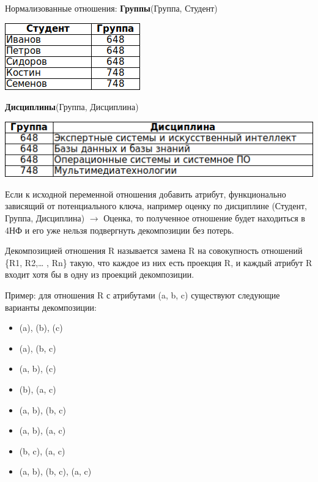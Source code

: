 \documentclass{beamer}
\begin{document}
\begin{frame}
Нормализованные отношения:
\textbf{Группы}(Группа, Студент)
\begin{center}
\includegraphics[scale=2]{images/ex-rasp-12.png}
\end{center}
\textbf{Дисциплины}(Группа, Дисциплина)
\begin{center}
\includegraphics[scale=2]{images/ex-rasp-13.png}
\end{center}
Если к исходной переменной отношения добавить атрибут, функционально зависящий от потенциального ключа, например оценку по дисциплине (Студент, Группа, Дисциплина) $\rightarrow$ Оценка, то полученное отношение будет находиться в 4НФ и его уже нельзя подвергнуть декомпозиции без потерь.
\end{frame}

\begin{frame}
\begin{block}{Декомпозицией отношения R}
называется замена R на совокупность отношений \{R1, R2,… , Rn\} такую, что каждое из них есть проекция R, и каждый атрибут R входит хотя бы в одну из проекций декомпозиции. 
\end{block}
Пример: для отношения R с атрибутами (a, b, c) существуют следующие варианты декомпозиции:
\begin{itemize}
\item (a), (b), (c)
\item (a), (b, c)
\item (a, b), (c)
\item (b), (a, c)
\item (a, b), (b, c)
\item (a, b), (a, c)
\item (b, c), (a, c)
\item (a, b), (b, c), (a, c)
\end{itemize}
\end{frame}
\end{document}
